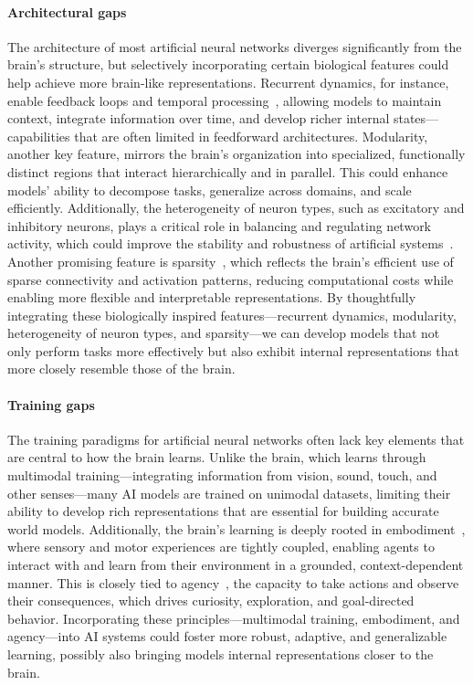 \paragraph{Architectural gaps}
The architecture of most artificial neural networks diverges significantly from the brain’s structure, but selectively incorporating certain biological features could help achieve more brain-like representations. Recurrent dynamics, for instance, enable feedback loops and temporal processing~\citep{goldman1995cellular}, allowing models to maintain context, integrate information over time, and develop richer internal states---capabilities that are often limited in feedforward architectures. Modularity, another key feature, mirrors the brain’s organization into specialized, functionally distinct regions that interact hierarchically and in parallel. This could enhance models’ ability to decompose tasks, generalize across domains, and scale efficiently. Additionally, the heterogeneity of neuron types, such as excitatory and inhibitory neurons, plays a critical role in balancing and regulating network activity, which could improve the stability and robustness of artificial systems~\citep{rubin2017balanced}. Another promising feature is sparsity~\citep{olshausen2004sparse}, which reflects the brain’s efficient use of sparse connectivity and activation patterns, reducing computational costs while enabling more flexible and interpretable representations. By thoughtfully integrating these biologically inspired features---recurrent dynamics, modularity, heterogeneity of neuron types, and sparsity---we can develop models that not only perform tasks more effectively but also exhibit internal representations that more closely resemble those of the brain.

\paragraph{Training gaps}
The training paradigms for artificial neural networks often lack key elements that are central to how the brain learns. Unlike the brain, which learns through multimodal training---integrating information from vision, sound, touch, and other senses---many AI models are trained on unimodal datasets, limiting their ability to develop rich representations that are essential for building accurate world models. Additionally, the brain’s learning is deeply rooted in embodiment~\citep{pfeifer2006body}, where sensory and motor experiences are tightly coupled, enabling agents to interact with and learn from their environment in a grounded, context-dependent manner. This is closely tied to agency~\citep{baldassarre2013intrinsically}, the capacity to take actions and observe their consequences, which drives curiosity, exploration, and goal-directed behavior. Incorporating these principles---multimodal training, embodiment, and agency---into AI systems could foster more robust, adaptive, and generalizable learning, possibly also bringing models internal representations closer to the brain.

